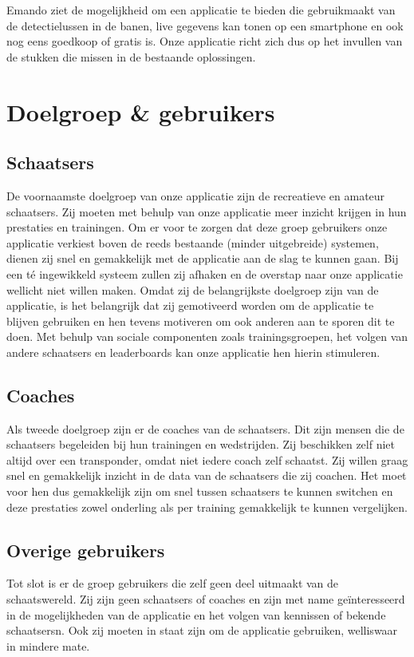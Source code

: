 Emando ziet de mogelijkheid om een applicatie te bieden die gebruikmaakt van de detectielussen in de banen, live gegevens kan tonen op een smartphone en ook nog eens goedkoop of gratis is. Onze applicatie richt zich dus op het invullen van de stukken die missen in de bestaande oplossingen.

\section{Doelgroep \& gebruikers}

\subsection{Schaatsers}
De voornaamste doelgroep van onze applicatie zijn de recreatieve en amateur schaatsers. Zij moeten met behulp van onze applicatie meer inzicht krijgen in hun prestaties en trainingen. 
Om er voor te zorgen dat deze groep gebruikers onze applicatie verkiest boven de reeds bestaande (minder uitgebreide) systemen, dienen zij snel en gemakkelijk met de applicatie aan de slag te kunnen gaan.
Bij een té ingewikkeld systeem zullen zij afhaken en de overstap naar onze applicatie wellicht niet willen maken.
Omdat zij de belangrijkste doelgroep zijn van de applicatie, is het belangrijk dat zij gemotiveerd worden om de applicatie te blijven gebruiken en hen tevens motiveren om ook anderen aan te sporen dit te doen.
Met behulp van sociale componenten zoals trainingsgroepen, het volgen van andere schaatsers en leaderboards kan onze applicatie hen hierin stimuleren.
\subsection{Coaches}
Als tweede doelgroep zijn er de coaches van de schaatsers. Dit zijn mensen die de schaatsers begeleiden bij hun trainingen en wedstrijden. Zij beschikken zelf niet altijd over een transponder, omdat niet iedere coach zelf schaatst.
Zij willen graag snel en gemakkelijk inzicht in de data van de schaatsers die zij coachen. Het moet voor hen dus gemakkelijk zijn om snel tussen schaatsers te kunnen switchen en deze prestaties zowel onderling als per training gemakkelijk te kunnen vergelijken.
\subsection{Overige gebruikers}
Tot slot is er de groep gebruikers die zelf geen deel uitmaakt van de schaatswereld. Zij zijn geen schaatsers of coaches en zijn met name geïnteresseerd in de mogelijkheden van de applicatie en het volgen van kennissen of bekende schaatsersn.
Ook zij moeten in staat zijn om de applicatie gebruiken, welliswaar in mindere mate.

